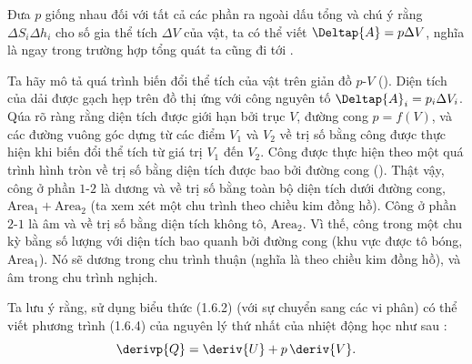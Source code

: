 \noindent
Đưa $p$ giống nhau đối với tất cả các phần ra ngoài dấu tổng và chú ý rằng $\Delta S_i\Delta h_i$ cho số gia thể tích $\Delta V$ của vật, ta có thể viết $\Deltap{A}=p\Delta V$, nghĩa là ngay trong trường hợp tổng quát ta cũng đi tới .

Ta hãy mô tả quá trình biến đổi thể tích của vật trên giản đồ $p$-$V$ (). Diện tích của dải được gạch hẹp trên đồ thị ứng với công nguyên tố $\Deltap{A}_i=p_i\Delta V_i$. Qúa rõ ràng rằng diện tích được giới hạn bởi trục $V$, đường cong $p=f(V)$, và các đường vuông góc dựng từ các điểm $V_1$ và $V_2$ về trị số bằng công được thực hiện khi biến đổi thể tích từ giá trị $V_1$ đến $V_2$. Công được thực hiện theo một quá trình hình tròn về trị số bằng diện tích được bao bởi đường cong (). Thật vậy, công ở phần $1$-$2$ là dương và về trị số bằng toàn bộ diện tích dưới đường cong, $\text{Area}_1+\text{Area}_2$ (ta xem xét một chu trình theo chiều kim đồng hồ). Công ở phần $2$-$1$ là âm và về trị số bằng diện tích không tô, $\text{Area}_2$. Vì thế, công trong một chu kỳ bằng số lượng với diện tích bao quanh bởi đường cong (khu vực được tô bóng, $\text{Area}_1$). Nó sẽ dương trong chu trình thuận (nghĩa là theo chiều kim đồng hồ), và âm trong chu trình nghịch.

Ta lưu ý rằng, sử dụng biểu thức (1.6.2) (với sự chuyển sang các vi phân) có thể viết phương trình (1.6.4) của nguyên lý thứ nhất của nhiệt động học như sau :
\begin{equation}\label{eq:10_13}
	\derivp{Q} = \deriv{U} + p\,\deriv{V}.
\end{equation}

